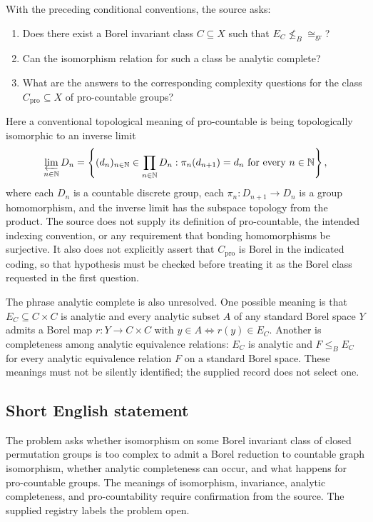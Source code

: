 \documentclass[11pt]{article}
\newcommand{\N}{\mathbb{N}}
\begin{document}
With the preceding conditional conventions, the source asks:
\begin{enumerate}
\item Does there exist a Borel invariant class $C\subseteq X$ such that $E_C\not\leq_B\cong_{\mathrm{gr}}$?
\item Can the isomorphism relation for such a class be analytic complete?
\item What are the answers to the corresponding complexity questions for the class $C_{\mathrm{pro}}\subseteq X$ of pro-countable groups?
\end{enumerate}
Here a conventional topological meaning of pro-countable is being topologically isomorphic to an inverse limit
\[
\varprojlim_{n\in\N}D_n
=\left\{(d_n)_{n\in\N}\in\prod_{n\in\N}D_n:
\pi_n(d_{n+1})=d_n\text{ for every }n\in\N\right\},
\]
where each $D_n$ is a countable discrete group, each $\pi_n:D_{n+1}\to D_n$ is a group homomorphism, and the inverse limit has the subspace topology from the product. The source does not supply its definition of pro-countable, the intended indexing convention, or any requirement that bonding homomorphisms be surjective. It also does not explicitly assert that $C_{\mathrm{pro}}$ is Borel in the indicated coding, so that hypothesis must be checked before treating it as the Borel class requested in the first question.

The phrase analytic complete is also unresolved. One possible meaning is that $E_C\subseteq C\times C$ is analytic and every analytic subset $A$ of any standard Borel space $Y$ admits a Borel map $r:Y\to C\times C$ with $y\in A\iff r(y)\in E_C$. Another is completeness among analytic equivalence relations: $E_C$ is analytic and $F\leq_B E_C$ for every analytic equivalence relation $F$ on a standard Borel space. These meanings must not be silently identified; the supplied record does not select one.
\subsection{Short English statement}
The problem asks whether isomorphism on some Borel invariant class of closed permutation groups is too complex to admit a Borel reduction to countable graph isomorphism, whether analytic completeness can occur, and what happens for pro-countable groups. The meanings of isomorphism, invariance, analytic completeness, and pro-countability require confirmation from the source. The supplied registry labels the problem open.
\end{document}
